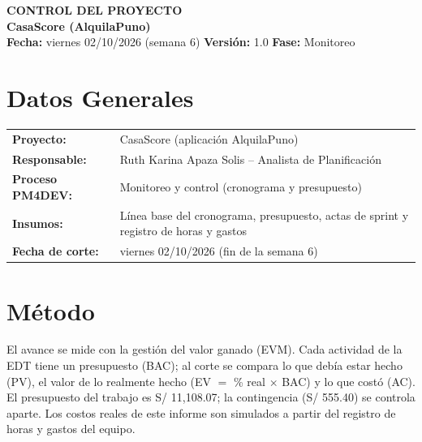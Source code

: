 \documentclass[11pt,a4paper]{article}
\begin{document}
\begin{center}
    {\Large \textbf{\textcolor{AzulUNA}{CONTROL DEL PROYECTO}}}\\[3pt]
    {\normalsize \textbf{CasaScore (AlquilaPuno)}}\\[4pt]
    \footnotesize \textbf{Fecha:} viernes 02/10/2026 (semana 6) \quad \textbar\quad \textbf{Versión:} 1.0 \quad \textbar\quad \textbf{Fase:} Monitoreo
\end{center}

\vspace{0.1cm}

\section{Datos Generales}
\noindent\begin{tabularx}{\textwidth}{@{}P{4.2cm} L@{}}
\toprule
\textbf{Proyecto:} & CasaScore (aplicación AlquilaPuno) \\
\textbf{Responsable:} & Ruth Karina Apaza Solis -- Analista de Planificación \\
\textbf{Proceso PM4DEV:} & Monitoreo y control (cronograma y presupuesto) \\
\textbf{Insumos:} & Línea base del cronograma, presupuesto, actas de sprint y registro de horas y gastos \\
\textbf{Fecha de corte:} & viernes 02/10/2026 (fin de la semana 6) \\
\bottomrule
\end{tabularx}

\section{Método}
El avance se mide con la gestión del valor ganado (EVM). Cada actividad de la EDT tiene un presupuesto (BAC); al corte se compara lo que debía estar hecho (PV), el valor de lo realmente hecho (EV $=$ \% real $\times$ BAC) y lo que costó (AC). El presupuesto del trabajo es S/ 11,108.07; la contingencia (S/ 555.40) se controla aparte. Los costos reales de este informe son simulados a partir del registro de horas y gastos del equipo.

\end{document}
